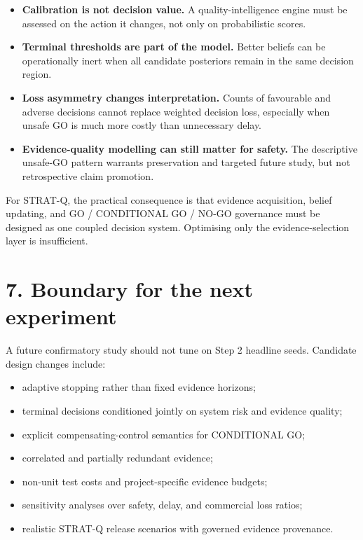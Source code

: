 \documentclass[11pt,a4paper]{article}
\begin{document}
\begin{itemize}
  \item \textbf{Calibration is not decision value.} A quality-intelligence engine must be assessed on the action it changes, not only on probabilistic scores.
  \item \textbf{Terminal thresholds are part of the model.} Better beliefs can be operationally inert when all candidate posteriors remain in the same decision region.
  \item \textbf{Loss asymmetry changes interpretation.} Counts of favourable and adverse decisions cannot replace weighted decision loss, especially when unsafe GO is much more costly than unnecessary delay.
  \item \textbf{Evidence-quality modelling can still matter for safety.} The descriptive unsafe-GO pattern warrants preservation and targeted future study, but not retrospective claim promotion.
\end{itemize}

For STRAT-Q, the practical consequence is that evidence acquisition, belief updating, and GO / CONDITIONAL GO / NO-GO governance must be designed as one coupled decision system. Optimising only the evidence-selection layer is insufficient.

\section*{7. Boundary for the next experiment}

A future confirmatory study should not tune on Step 2 headline seeds. Candidate design changes include:

\begin{itemize}
  \item adaptive stopping rather than fixed evidence horizons;
  \item terminal decisions conditioned jointly on system risk and evidence quality;
  \item explicit compensating-control semantics for CONDITIONAL GO;
  \item correlated and partially redundant evidence;
  \item non-unit test costs and project-specific evidence budgets;
  \item sensitivity analyses over safety, delay, and commercial loss ratios;
  \item realistic STRAT-Q release scenarios with governed evidence provenance.
\end{itemize}
\end{document}
